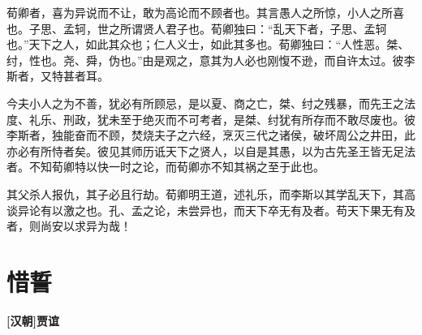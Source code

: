 \documentclass[UTF8,titlepage,oneside]{ctexbook}
\begin{document}
荀卿者，喜为异说而不让，敢为高论而不顾者也。其言愚人之所惊，小人之所喜也。子思、孟轲，世之所谓贤人君子也。荀卿独曰：“乱天下者，子思、孟轲也。”天下之人，如此其众也；仁人义士，如此其多也。荀卿独曰：“人性恶。桀、纣，性也。尧、舜，伪也。”由是观之，意其为人必也刚愎不逊，而自许太过。彼李斯者，又特甚者耳。


今夫小人之为不善，犹必有所顾忌，是以夏、商之亡，桀、纣之残暴，而先王之法度、礼乐、刑政，犹未至于绝灭而不可考者，是桀、纣犹有所存而不敢尽废也。彼李斯者，独能奋而不顾，焚烧夫子之六经，烹灭三代之诸侯，破坏周公之井田，此亦必有所恃者矣。彼见其师历诋天下之贤人，以自是其愚，以为古先圣王皆无足法者。不知荀卿特以快一时之论，而荀卿亦不知其祸之至于此也。


其父杀人报仇，其子必且行劫。荀卿明王道，述礼乐，而李斯以其学乱天下，其高谈异论有以激之也。孔、孟之论，未尝异也，而天下卒无有及者。苟天下果无有及者，则尚安以求异为哉！



\chapter*{惜誓}
\begin{center}
	\textbf{[汉朝]贾谊}
\end{center}
\end{document}
